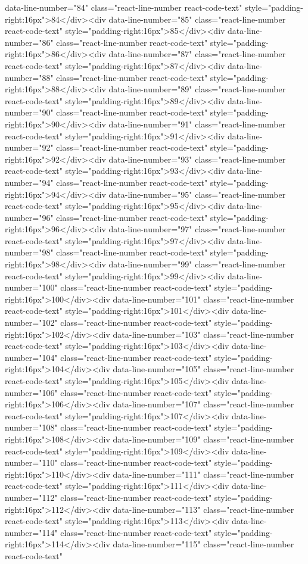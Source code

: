 {{{{{data-line-number="84" class="react-line-number react-code-text" style="padding-right:16px">84</div><div data-line-number="85" class="react-line-number react-code-text" style="padding-right:16px">85</div><div data-line-number="86" class="react-line-number react-code-text" style="padding-right:16px">86</div><div data-line-number="87" class="react-line-number react-code-text" style="padding-right:16px">87</div><div data-line-number="88" class="react-line-number react-code-text" style="padding-right:16px">88</div><div data-line-number="89" class="react-line-number react-code-text" style="padding-right:16px">89</div><div data-line-number="90" class="react-line-number react-code-text" style="padding-right:16px">90</div><div data-line-number="91" class="react-line-number react-code-text" style="padding-right:16px">91</div><div data-line-number="92" class="react-line-number react-code-text" style="padding-right:16px">92</div><div data-line-number="93" class="react-line-number react-code-text" style="padding-right:16px">93</div><div data-line-number="94" class="react-line-number react-code-text" style="padding-right:16px">94</div><div data-line-number="95" class="react-line-number react-code-text" style="padding-right:16px">95</div><div data-line-number="96" class="react-line-number react-code-text" style="padding-right:16px">96</div><div data-line-number="97" class="react-line-number react-code-text" style="padding-right:16px">97</div><div data-line-number="98" class="react-line-number react-code-text" style="padding-right:16px">98</div><div data-line-number="99" class="react-line-number react-code-text" style="padding-right:16px">99</div><div data-line-number="100" class="react-line-number react-code-text" style="padding-right:16px">100</div><div data-line-number="101" class="react-line-number react-code-text" style="padding-right:16px">101</div><div data-line-number="102" class="react-line-number react-code-text" style="padding-right:16px">102</div><div data-line-number="103" class="react-line-number react-code-text" style="padding-right:16px">103</div><div data-line-number="104" class="react-line-number react-code-text" style="padding-right:16px">104</div><div data-line-number="105" class="react-line-number react-code-text" style="padding-right:16px">105</div><div data-line-number="106" class="react-line-number react-code-text" style="padding-right:16px">106</div><div data-line-number="107" class="react-line-number react-code-text" style="padding-right:16px">107</div><div data-line-number="108" class="react-line-number react-code-text" style="padding-right:16px">108</div><div data-line-number="109" class="react-line-number react-code-text" style="padding-right:16px">109</div><div data-line-number="110" class="react-line-number react-code-text" style="padding-right:16px">110</div><div data-line-number="111" class="react-line-number react-code-text" style="padding-right:16px">111</div><div data-line-number="112" class="react-line-number react-code-text" style="padding-right:16px">112</div><div data-line-number="113" class="react-line-number react-code-text" style="padding-right:16px">113</div><div data-line-number="114" class="react-line-number react-code-text" style="padding-right:16px">114</div><div data-line-number="115" class="react-line-number react-code-text" }}}}}
